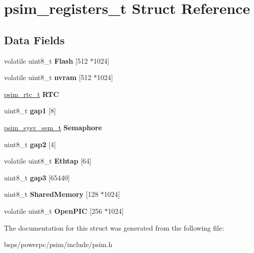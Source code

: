 \hypertarget{structpsim__registers__t}{}\section{psim\+\_\+registers\+\_\+t Struct Reference}
\label{structpsim__registers__t}
\subsection*{Data Fields}
\begin{DoxyCompactItemize}
\item 
\mbox{\label{structpsim__registers__t_aa5cdb0e43fcafcb2f2fbf13299b1801f}} 
volatile uint8\+\_\+t {\bfseries Flash} \mbox{[}512 $\ast$1024\mbox{]}
\item 
\mbox{\label{structpsim__registers__t_a9d9b77bab20fb5df03508e2daef46c2a}} 
volatile uint8\+\_\+t {\bfseries nvram} \mbox{[}512 $\ast$1024\mbox{]}
\item 
\mbox{\label{structpsim__registers__t_a6aec4a7b79331155c121867095a39a26}} 
\mbox{\hyperlink{structpsim__rtc__t}{psim\+\_\+rtc\+\_\+t}} {\bfseries R\+TC}
\item 
\mbox{\label{structpsim__registers__t_a1112bd3621c3c8f1ab7c20ffd9c2361c}} 
uint8\+\_\+t {\bfseries gap1} \mbox{[}8\mbox{]}
\item 
\mbox{\label{structpsim__registers__t_a9162a34bf96e746fc71a02de5a27c298}} 
\mbox{\hyperlink{structpsim__sysv__sem__t}{psim\+\_\+sysv\+\_\+sem\+\_\+t}} {\bfseries Semaphore}
\item 
\mbox{\label{structpsim__registers__t_a31f0681166e39d60c34e641f3f4e87b9}} 
uint8\+\_\+t {\bfseries gap2} \mbox{[}4\mbox{]}
\item 
\mbox{\label{structpsim__registers__t_af672f09f3f5d28b492bdb5a7c23b842e}} 
volatile uint8\+\_\+t {\bfseries Ethtap} \mbox{[}64\mbox{]}
\item 
\mbox{\label{structpsim__registers__t_a46489604d8b0f60d2aef02bb4febd107}} 
uint8\+\_\+t {\bfseries gap3} \mbox{[}65440\mbox{]}
\item 
\mbox{\label{structpsim__registers__t_a6d85b707f7dd0e704c64ca394fa1ed5d}} 
uint8\+\_\+t {\bfseries Shared\+Memory} \mbox{[}128 $\ast$1024\mbox{]}
\item 
\mbox{\label{structpsim__registers__t_aaa7c2b5c09ccb39c5d0a6205313b1b24}} 
volatile uint8\+\_\+t {\bfseries Open\+P\+IC} \mbox{[}256 $\ast$1024\mbox{]}
\end{DoxyCompactItemize}


The documentation for this struct was generated from the following file\+:\begin{DoxyCompactItemize}
\item 
bsps/powerpc/psim/include/psim.\+h\end{DoxyCompactItemize}

